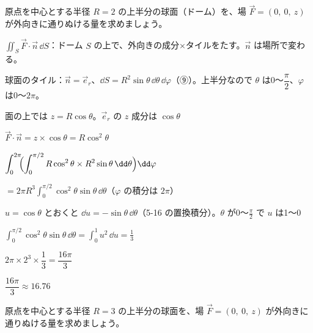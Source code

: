 \begin{reidai}
原点を中心とする半径 $R=2$ の上半分の球面（ドーム）を、場 $\vec F=(0,\ 0,\ z)$ が外向きに通りぬける量を求めましょう。\par
\kangaekata {}\par
{}\enspace $\displaystyle\iint_S\vec F\cdot\vec n\,\dd S$：ドーム $S$ の上で、外向きの成分×タイルをたす。$\vec n$ は場所で変わる。\par
{}\enspace 球面のタイル：$\vec n=\vec e_r$、$\dd S=R^2\sin\theta\,\dd\theta\,\dd\varphi$（⑨）。上半分なので $\theta$ は0〜$\dfrac{\pi}{2}$、$\varphi$ は0〜$2\pi$。\par
\shiki\kviiiis{}\zw{} 面の上では $z=R\cos\theta$。$\vec e_r$ の $z$ 成分は $\cos\theta$\par
\kviiiia $\vec F\cdot\vec n=z\times\cos\theta=R\cos^2\theta$\par
\kviiiia $\displaystyle\int_0^{2\pi}\!\!\Bigl(\int_0^{\pi/2}R\cos^2\theta\times R^2\sin\theta\,\dd\theta\Bigr)\dd\varphi$\par
\kviiiib $\displaystyle=2\pi R^3\int_0^{\pi/2}\cos^2\theta\sin\theta\,\dd\theta$（$\varphi$ の積分は $2\pi$）\par
\kviiiia $u=\cos\theta$ とおくと $\dd u=-\sin\theta\,\dd\theta$（5-16 の置換積分）。$\theta$ が0〜$\frac{\pi}{2}$ で $u$ は1〜0\par
\kviiiib $\displaystyle\int_0^{\pi/2}\cos^2\theta\sin\theta\,\dd\theta=\int_0^1u^2\,\dd u=\frac13$\par
\kviiiia $2\pi\times2^3\times\dfrac13=\dfrac{16\pi}{3}$\par
\kotae\kviiiis{}\zw{} $\dfrac{16\pi}{3}\approx16.76$
\end{reidai}

\begin{jibun}
原点を中心とする半径 $R=3$ の上半分の球面を、場 $\vec F=(0,\ 0,\ z)$ が外向きに通りぬける量を求めましょう。
\end{jibun}

